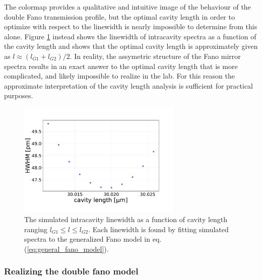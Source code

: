 The colormap provides a qualitative and intuitive image of the behaviour of the double Fano transmission profile, but the optimal cavity length in order to optimize with respect to the linewidth is nearly impossible to determine from this alone. Figure \ref{fig:G1/G2_lw_vs_cavity_length} instead shows the linewidth of intracavity spectra as a function of the cavity length and shows that the optimal cavity length is approximately given as $l \approx (l_{G1} + l_{G2})/2$. In reality, the assymetric structure of the Fano mirror spectra results in an exact answer to the optimal cavity length that is more complicated, and likely impossible to realize in the lab. For this reason the approximate interpretation of the cavity length analysis is sufficient for practical purposes.

\begin{figure}[h!]
    \centering
    \includegraphics[width=0.7\textwidth]{figures/results/M3:M5/M3:M5_lw_vs_length.pdf}
    \caption{The simulated intracavity linewidth as a function of cavity length ranging $l_{G1} \leq l \leq l_{G2}$. Each linewidth is found by fitting simulated spectra to the generalized Fano model in eq. (\ref{eq:general_fano_model}).}
    \label{fig:G1/G2_lw_vs_cavity_length}
\end{figure}

\clearpage
\subsubsection{Realizing the double fano model}\label{sec:realizing_the_double_fano_model}

